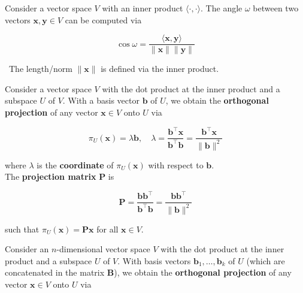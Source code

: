 \begin{minipage}{0.48\textwidth}
	\divider
	
	
	Consider a vector space $V$ with an inner product $\langle\cdot, \cdot\rangle$. The angle $\omega$ between two vectors $\boldsymbol{x}, \boldsymbol{y} \in V$ can be computed via
	
	\[
		\cos \omega=\frac{\langle\boldsymbol{x}, \boldsymbol{y}\rangle}{\|\boldsymbol{x}\|\|\boldsymbol{y}\|}
	\]
	
	{\small \faLightbulb} \ The length/norm $\|\boldsymbol{x}\|$ is defined via the inner product.
	
	\vspace{0.5cm}
	
\end{minipage}
\hfill
\begin{minipage}{0.48\textwidth}
	
	\vspace{-1.8cm}
	
	\topic[Projections]
	
	Consider a vector space $V$ with the dot product at the inner product and a subspace $U$ of $V$. With a basis vector $\boldsymbol{b}$ of $U$, we obtain the \textbf{orthogonal projection} of any vector $\boldsymbol{x} \in V$ onto $U$ via
	
	\[
		\pi_{U}(\boldsymbol{x})=\lambda \boldsymbol{b}, \quad \lambda=\frac{\boldsymbol{b}^{\top} \boldsymbol{x}}{\boldsymbol{b}^{\top} \boldsymbol{b}}=\frac{\boldsymbol{b}^{\top} \boldsymbol{x}}{\|\boldsymbol{b}\|^{2}}
	\]
	
	where $\lambda$ is the \textbf{coordinate} of $\pi_{U}(\boldsymbol{x})$ with respect to $\boldsymbol{b}$. \\
	The \textbf{projection matrix} $\boldsymbol{P}$ is
	
	\[
		\boldsymbol{P}=\frac{\boldsymbol{b} \boldsymbol{b}^{\top}}{\boldsymbol{b}^{\top} \boldsymbol{b}}=\frac{\boldsymbol{b} \boldsymbol{b}^{\top}}{\|\boldsymbol{b}\|^{2}}
	\]
	
	such that $\pi_{U}(\boldsymbol{x})=\boldsymbol{P} \boldsymbol{x}$ for all $\boldsymbol{x} \in V$.
	
	\divider 
	
	
	Consider an $n$-dimensional vector space $V$ with the dot product at the inner product and a subspace $U$ of $V$. With basis vectors $\boldsymbol{b}_{1}, \ldots, \boldsymbol{b}_{k}$ of $U$ (which are concatenated in the matrix $\boldsymbol{B}$), we obtain the \textbf{orthogonal projection} of any vector $\boldsymbol{x} \in V$ onto $U$ via
	

\end{minipage}
